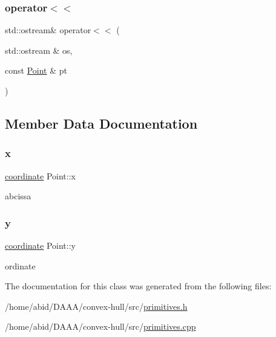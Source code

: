 \subsubsection{\texorpdfstring{operator$<$$<$}{operator<<}}
{\footnotesize\ttfamily std\+::ostream\& operator$<$$<$ (\begin{DoxyParamCaption}\item[{std\+::ostream \&}]{os,  }\item[{const \mbox{\hyperlink{class_point}{Point}} \&}]{pt }\end{DoxyParamCaption})\hspace{0.3cm}{\ttfamily [friend]}}



\subsection{Member Data Documentation}
\mbox{\label{class_point_a2e5bf2da8d7f35ef2ca707ae5ec1929b}} 
\subsubsection{\texorpdfstring{x}{x}}
{\footnotesize\ttfamily \mbox{\hyperlink{primitives_8h_a9949b5198385a93773b854932cb22e08}{coordinate}} Point\+::x}

abcissa \mbox{\label{class_point_a4390d37c7ed19ad07212fc84df2fe26e}} 
\subsubsection{\texorpdfstring{y}{y}}
{\footnotesize\ttfamily \mbox{\hyperlink{primitives_8h_a9949b5198385a93773b854932cb22e08}{coordinate}} Point\+::y}

ordinate 

The documentation for this class was generated from the following files\+:\begin{DoxyCompactItemize}
\item 
/home/abid/\+D\+A\+A\+A/convex-\/hull/src/\mbox{\hyperlink{primitives_8h}{primitives.\+h}}\item 
/home/abid/\+D\+A\+A\+A/convex-\/hull/src/\mbox{\hyperlink{primitives_8cpp}{primitives.\+cpp}}\end{DoxyCompactItemize}
